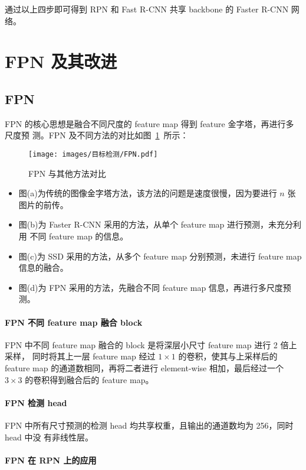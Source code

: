 通过以上四步即可得到 RPN 和 Fast R-CNN 共享 backbone 的 Faster R-CNN 网络。

\section{FPN 及其改进}
\label{sec:FPN}

\subsection{FPN}
FPN 的核心思想是融合不同尺度的 feature map 得到 feature 金字塔，再进行多尺度预
测。FPN 及不同方法的对比如图~\ref{fig:FPN}~所示：

\begin{figure}[ht]
  \centering
  \texttt{[image: images/目标检测/FPN.pdf]}
  \caption{FPN 与其他方法对比}
  \label{fig:FPN}
\end{figure}

\begin{itemize}
  \item 图(a)为传统的图像金字塔方法，该方法的问题是速度很慢，因为要进行 $n$ 张
    图片的前传。
  \item 图(b)为 Faster R-CNN 采用的方法，从单个 feature map 进行预测，未充分利用
    不同 feature map 的信息。
  \item 图(c)为 SSD 采用的方法，从多个 feature map 分别预测，未进行 feature map 信息的融合。
  \item 图(d)为 FPN 采用的方法，先融合不同 feature map 信息，再进行多尺度预测。
\end{itemize}

\paragraph{FPN 不同 feature map 融合 block}
FPN 中不同 feature map 融合的 block 是将深层小尺寸 feature map 进行 2 倍上采样，
同时将其上一层 feature map 经过 $1 \times 1$ 的卷积，使其与上采样后的 feature
map 的通道数相同，再将二者进行 element-wise 相加，最后经过一个 $3 \times 3$
的卷积得到融合后的 feature map。

\paragraph{FPN 检测 head}
FPN 中所有尺寸预测的检测 head 均共享权重，且输出的通道数均为 256，同时 head 中没
有非线性层。

\paragraph{FPN 在 RPN 上的应用}

